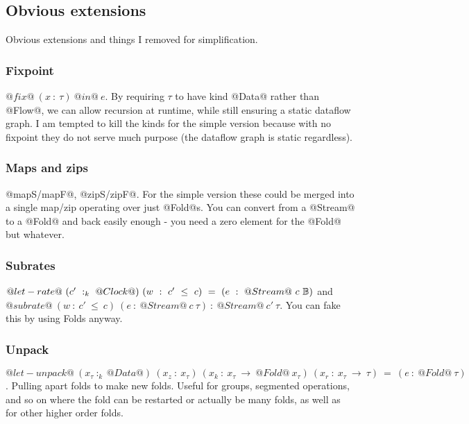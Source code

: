 

\subsection{Obvious extensions}
Obvious extensions and things I removed for simplification.

\subsubsection{Fixpoint}
$@fix@~(x~:~\tau)~@in@~e$.
By requiring $\tau$ to have kind @Data@ rather than @Flow@, we can allow recursion at runtime, while still ensuring a static dataflow graph.
I am tempted to kill the kinds for the simple version because with no fixpoint they do not serve much purpose (the dataflow graph is static regardless).

\subsubsection{ Maps and zips }
@mapS/mapF@, @zipS/zipF@.
For the simple version these could be merged into a single map/zip operating over just @Fold@s.
You can convert from a @Stream@ to a @Fold@ and back easily enough - you need a zero element for the @Fold@ but whatever.

\subsubsection{ Subrates }
$@let-rate@~(c'~:_k~@Clock@)~(w~:~c'~\le~c)~=~(e~:~@Stream@~c~\mathbb{B})$ and $@subrate@~(w~:~c'~\le~c)~(e~:~@Stream@~c~\tau)~:~@Stream@~c'~\tau$.
You can fake this by using Folds anyway.

\subsubsection{ Unpack }
$@let-unpack@~(x_\tau~:_k~@Data@)~(x_z~:~x_\tau)~(x_k~:~x_\tau~\to~@Fold@~x_\tau)~(x_r~:~x_\tau~\to~\tau)~=~(e~:~@Fold@~\tau)$.
Pulling apart folds to make new folds.
Useful for groups, segmented operations, and so on where the fold can be restarted or actually be many folds, as well as for other higher order folds.

